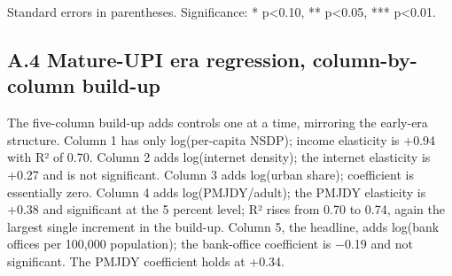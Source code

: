 \documentclass[
]{article}
\begin{document}
Standard errors in parentheses. Significance: * p\textless0.10, **
p\textless0.05, *** p\textless0.01.

\subsection{A.4 Mature-UPI era regression, column-by-column
build-up}\label{a.4-mature-upi-era-regression-column-by-column-build-up}

The five-column build-up adds controls one at a time, mirroring the
early-era structure. Column 1 has only log(per-capita NSDP); income
elasticity is +0.94 with R² of 0.70. Column 2 adds log(internet
density); the internet elasticity is +0.27 and is not significant.
Column 3 adds log(urban share); coefficient is essentially zero. Column
4 adds log(PMJDY/adult); the PMJDY elasticity is +0.38 and significant
at the 5 percent level; R² rises from 0.70 to 0.74, again the largest
single increment in the build-up. Column 5, the headline, adds log(bank
offices per 100,000 population); the bank-office coefficient is −0.19
and not significant. The PMJDY coefficient holds at +0.34.
\end{document}
